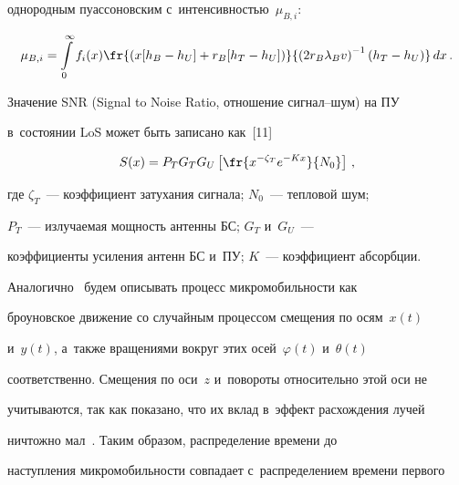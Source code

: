 однородным пуассоновским с~ин\-тен\-сив\-ностью~$\mu_{B,i}$:


     \begin{equation}


     \mu_{B,i}=\int\limits_0^\infty f_i(x) \fr{\left( x[h_B-h_U]+r_B[h_T-


h_U]\right)}{\left( 2r_B \lambda_B v\right)^{-1} \left( h_T-h_U\right)}\,dx\,.


     \label{e2-bes}


     \end{equation}


  


  Значение SNR (Signal to Noise Ratio, отношение сиг\-нал--шум) на ПУ  


в~со\-сто\-янии LoS может быть записано как~[11]





\noindent


  \begin{equation*}


  S(x)=P_T G_T G_U \left[ \fr{x^{-\zeta_T} e^{-Kx}}{N_0}\right]\,,




  \end{equation*}


где $\zeta_T$~--- коэффициент затухания сигнала; $N_0$~--- теп\-ло\-вой шум; 


$P_T$~--- из\-лу\-ча\-емая мощ\-ность антенны БС; $G_T$ и~$G_U$~--- 


коэффициенты усиления антенн БС и~ПУ; $K$~--- коэффициент аб\-сорб\-ции.





  Аналогично~\cite{4-bes} будем описывать процесс мик\-ро\-мо\-биль\-ности как 


броуновское движение со случайным процессом смещения по осям~$x(t)$ 


и~$y(t)$, а~так\-же вращениями вокруг этих осей~$\varphi(t)$ и~$\theta(t)$ 


соответственно. Смещения по оси~$z$ и~повороты относительно этой оси не 


учитываются, так как показано, что их вклад в~эффект расхождения лучей 


нич\-тож\-но мал~\cite{4-bes}. Таким образом, распределение времени до 


наступления мик\-ро\-мо\-биль\-ности совпадает с~распределением времени первого 


